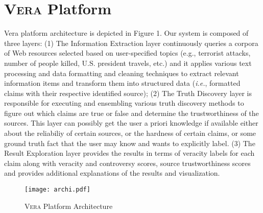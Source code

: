 \section{{\scshape Vera} Platform}

\medskip

Vera platform architecture is depicted in Figure 1. Our system is composed of three layers: 
(1) The Information Extraction layer continuously queries a corpora of Web resources selected based on user-specified topics (e.g., terrorist attacks, number of people killed, U.S. president travels, etc.) and it applies various text processing and data formatting and cleaning techniques to extract relevant information items and transform them into structured data ({\it i.e.}, formatted claims with their respective identified source);
(2) The Truth Discovery layer is responsible for executing and ensembling various truth discovery methods to figure out which claims are true or false  and determine the trustworthiness of the sources. This layer  can possibly get the user a priori knowledge if available either about the reliabiliy of certain sources, or the hardness of certain claims, or some ground truth fact that the user may know and wants to explicitly label.
(3) The Result Exploration layer provides the results in terms of veracity labels for each claim along with veracity and controversy scores, source trustworthiness scores and provides additional explanations of the results and visualization.

\begin{figure*}[!ht]
 \begin{center}
  \texttt{[image: archi.pdf]}
   \end{center}
\label{archi}\caption{{\scshape Vera} Platform Architecture }
\end{figure*}

